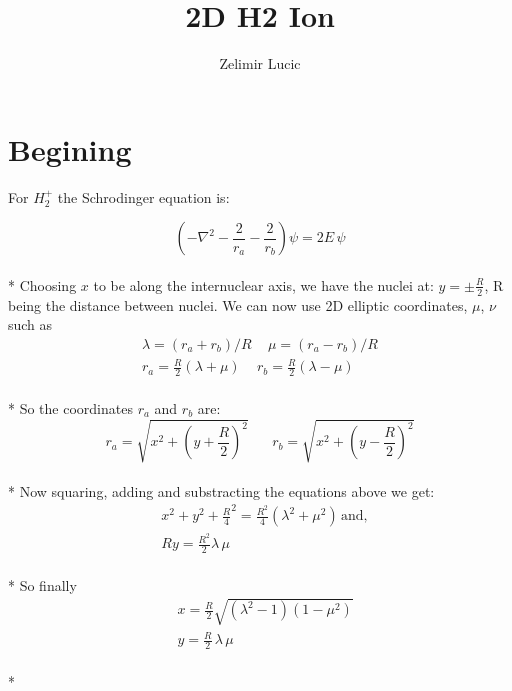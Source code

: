 \documentclass[11pt, oneside]{article}   	%
\title{2D H2 Ion}
\author{Zelimir Lucic}
\date{}							%
\begin{document}
\maketitle
\section{Begining}

For $ H_2^+ $ the Schrodinger equation is:

\begin{equation}\label{start}
\left(-\nabla^2-\frac{2}{r_a}-\frac{2}{r_b}\right)\psi = 2E\,\psi
\end{equation} \\*
Choosing $ x $ to be along the internuclear axis, we have the nuclei at: $ y = \pm \frac{R}{2}  $, R being the distance between nuclei. We can now use 2D elliptic coordinates, $ \mu $, $ \nu $ such as 
\begin{equation}\label{variables}
\begin{split}
\lambda = \left(r_a + r_b\right)/R\,\,\,\,\,\,\,\mu =  \left(r_a - r_b\right)/R  \\
r_a = \frac{R}{2}\left(\lambda + \mu \right)\,\,\,\,\,\,\, r_b = \frac{R}{2}\left(\lambda - \mu \right)
\end{split}
\end{equation}\\*
So the coordinates $ r_a $ and $ r_b $ are:
\begin{equation}
r_a  = \sqrt{x^2 + \left(y + \frac{R}{2}\right)^2 }\,\,\,\,\,\,\,\,\,\,r_b  = \sqrt{x^2 + \left(y - \frac{R}{2}\right)^2 }
\end{equation}\\*
Now squaring, adding and substracting the equations above we get:
\begin{equation}
\begin{split}
& x^2 + y ^2 + \frac{R}{4}^2 = \frac{R^2}{4}\left(\lambda^2 + \mu^2\right) \,\text{and},\\
& Ry = \frac{R^2}{2} \lambda\, \mu
\end{split}
\end{equation}\\*
So finally
\begin{equation}
\begin{split}
& x = \frac{R}{2}\sqrt{\left(\lambda^2 - 1\right)\left(1 - \mu ^2 \right) } \\
& y = \frac{R}{2}\,\lambda\,\mu
\end{split}
\end{equation}\\*
\end{document}
